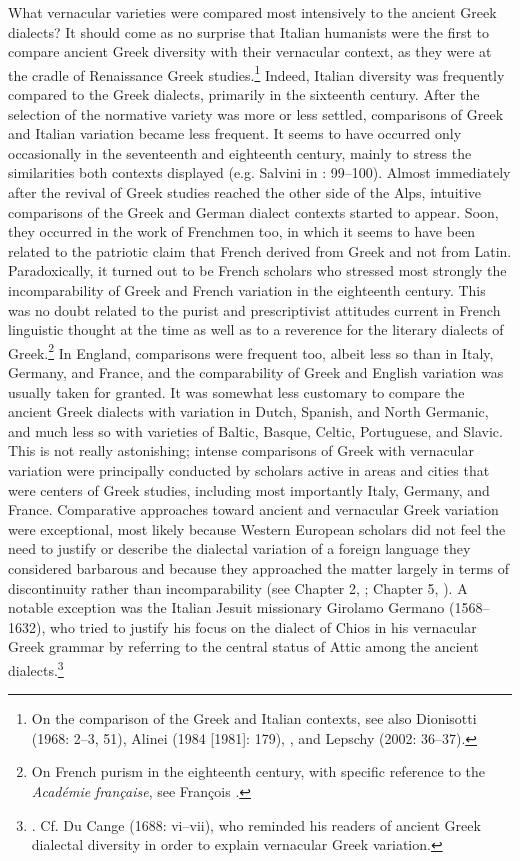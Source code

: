 \documentclass[output=paper]{langsci/langscibook}
\begin{document}
What vernacular varieties were compared most intensively to the ancient Greek dialects? It should come as no surprise that Italian humanists were the first to compare ancient Greek diversity with their vernacular context, as they were at the cradle of Renaissance Greek studies.\footnote{On the comparison of the Greek and Italian contexts, see also Dionisotti (1968: 2–3, 51), Alinei (1984 [1981]: 179), \citet[215]{Trovato1984}, and Lepschy (2002: 36–37).} Indeed, Italian diversity was frequently compared to the Greek dialects, primarily in the sixteenth century. After the selection of the normative variety was more or less settled, comparisons of Greek and Italian variation became less frequent. It seems to have occurred only occasionally in the seventeenth and eighteenth century, mainly to stress the similarities both contexts displayed (e.g. Salvini in \citealt{MuratoriSalvini1724}: 99–100). Almost immediately after the revival of Greek studies reached the other side of the Alps, intuitive comparisons of the Greek and German dialect contexts started to appear. Soon, they occurred in the work of Frenchmen too, in which it seems to have been related to the patriotic claim that French derived from Greek and not from Latin. Paradoxically, it turned out to be French scholars who stressed most strongly the incomparability of Greek and French variation in the eighteenth century. This was no doubt related to the purist and prescriptivist attitudes current in French linguistic thought at the time as well as to a reverence for the literary dialects of Greek.\footnote{On French purism in the eighteenth century, with specific reference to the \textit{Académie} \textit{française}, see François .} In England, comparisons were frequent too, albeit less so than in Italy, Germany, and France, and the comparability of Greek and English variation was usually taken for granted. It was somewhat less customary to compare the ancient Greek dialects with variation in Dutch, Spanish, and North Germanic, and much less so with varieties of Baltic, Basque, Celtic, Portuguese, and Slavic. This is not really astonishing; intense comparisons of Greek with vernacular variation were principally conducted by scholars active in areas and cities that were centers of Greek studies, including most importantly Italy, Germany, and France. Comparative approaches toward ancient and vernacular Greek variation were exceptional, most likely because Western European scholars did not feel the need to justify or describe the dialectal variation of a foreign language they considered barbarous and because they approached the matter largely in terms of discontinuity rather than incomparability (see Chapter 2, ; Chapter 5, ). A notable exception was the Italian Jesuit missionary Girolamo Germano (1568–1632), who tried to justify his focus on the dialect of Chios in his vernacular Greek grammar by referring to the central status of Attic among the ancient dialects.\footnote{\citet[10]{Germano1622}. Cf. Du Cange (1688: vi–vii), who reminded his readers of ancient Greek dialectal diversity in order to explain vernacular Greek variation.}
\end{document}
